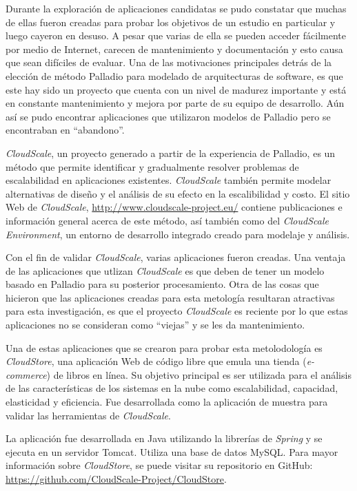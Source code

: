 \documentclass[11pt, twoside]{report}
\begin{document}
Durante la exploración de aplicaciones candidatas se pudo constatar que muchas de ellas fueron creadas para probar los objetivos de un estudio en particular y luego cayeron en desuso. A pesar que varias de ella se pueden acceder fácilmente por medio de Internet, carecen de mantenimiento y documentación y esto causa que sean difíciles de evaluar. Una de las motivaciones principales detrás de la elección de método Palladio para modelado de arquitecturas de software, es que este hay sido un proyecto que cuenta con un nivel de madurez importante y está en constante mantenimiento y mejora por parte de su equipo de desarrollo. Aún así se pudo encontrar aplicaciones que utilizaron modelos de Palladio pero se encontraban en ``abandono''. 

\emph{CloudScale}, un proyecto generado a partir de la experiencia de Palladio, es un método que permite identificar y gradualmente resolver problemas de escalabilidad en aplicaciones existentes. \emph{CloudScale} también permite modelar alternativas de diseño y el análisis de su efecto en la escalibilidad y costo\cite{cloudscale}. El sitio Web de \emph{CloudScale}, \url{http://www.cloudscale-project.eu/} contiene publicaciones e información general acerca de este método, así también como del \emph{CloudScale Environment}, un entorno de desarrollo integrado creado para modelaje y análisis. 

Con el fin de validar \emph{CloudScale}, varias aplicaciones fueron creadas. Una ventaja de las aplicaciones que utlizan \emph{CloudScale} es que deben de tener un modelo basado en Palladio para su posterior procesamiento. Otra de las cosas que hicieron que las aplicaciones creadas para esta metología resultaran atractivas para esta investigación, es que el proyecto \emph{CloudScale} es reciente por lo que estas aplicaciones no se consideran como ``viejas'' y se les da mantenimiento. 

Una de estas aplicaciones que se crearon para probar esta metolodología es \emph{CloudStore}, una aplicación Web de código libre que emula una tienda (\emph{e-commerce}) de libros en línea. Su objetivo principal es ser utilizada para el análisis de las características de los sistemas en la nube como escalabilidad, capacidad, elasticidad y eficiencia. Fue desarrollada como la aplicación de muestra para validar las herramientas de \emph{CloudScale}.

La aplicación fue desarrollada en Java utilizando la librerías de \emph{Spring} y se ejecuta en un servidor Tomcat. Utiliza una base de datos MySQL. Para mayor información sobre \emph{CloudStore}, se puede visitar su repositorio en GitHub: \url{https://github.com/CloudScale-Project/CloudStore}.
\end{document}
